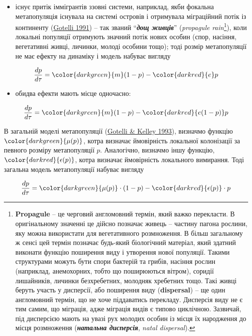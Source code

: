 \documentclass[
  11pt,
]{book}
\providecommand{\tightlist}{%
  \setlength{\itemsep}{0pt}\setlength{\parskip}{0pt}}
\begin{document}
\begin{itemize}
\tightlist
\item
  існує притік іммігрантів ззовні системи, наприклад, якби фокальна метапопуляція існувала на системі островів і отримувала міграційний потік із континенту (\href{https://doi.org/10.1086/285249}{Gotelli 1991}) -- так званий ``\textbf{\emph{дощ живців}}'' (\emph{propagule rain}\footnote{\textbf{Propagule} -- це черговий англомовний термін, який важко перекласти. В оригінальному значенні це дійсно позначає живець -- частину пагона рослини, яку можна використати для вегетативного розмноження. В більш загальному ж сенсі цей термін позначає будь-який біологічний матеріал, який здатний виконати функцію поширення виду і утворення нової популяції. Такими структурами можуть бути спори бактерій та грибів, насіння рослин (наприклад, анемохорних, тобто що поширюються вітром), соридії лишайників, личинки безхребетних, молодняк хребетних тощо. Такі живці беруть участь у дисперсії, або поширення виду (\textbf{dispersal}) -- ще один англомовний термін, що не хоче піддаватись перекладу. Дисперсія виду не є тим самим, що міграція, адже міграція видів є типово циклічною. Зазвичай, під дисперсією мають на увазі рух молодих особин із місця їх народження до місця розмноження (\textbf{\emph{натальна дисперсія}}, \emph{natal dispersal}).}), коли локальні популяції отримують значний потік нових особин (спор, насіння, вегетативні живці, личинки, молоді особини тощо); тоді розмір метапопуляції не має ефекту на динаміку і модель набуває вигляду
\end{itemize}

\[\frac{dp}{d\tau} = \color{darkgreen}{m}(1 - p) - \color{darkred}{e}p\]

\begin{itemize}
\tightlist
\item
  обидва ефекти мають місце одночасно:
\end{itemize}

\[\frac{dp}{d\tau} = \color{darkgreen}{m}(1 - p) - \color{darkred}{e(1-p)}p\]

В загальній моделі метапопуляції (\href{https://doi.org/10.2307/3545306}{Gotelli \& Kelley 1993}), визначмо функцію \(\color{darkgreen}{\mu(p)}\), котра визначає ймовірність локальної колонізації за певного розміру метапопуляції \(p\). Аналогічно, визначмо іншу функцію, \(\color{darkred}{\epsilon(p)}\), котра визначає ймовірність локального вимирання. Тоді загальна модель метапопуляції набуває вигляду

\[\frac{dp}{d\tau} = \color{darkgreen}{\mu(p)} \cdot (1-p) - \color{darkred}{\epsilon(p)} \cdot p\]
\end{document}
